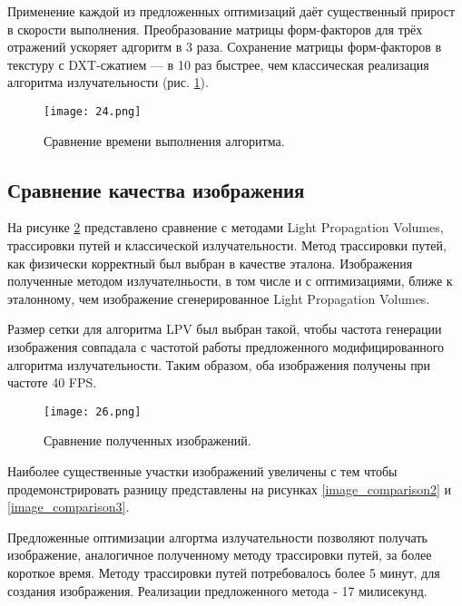 \documentclass[12pt,fleqn]{article}
\begin{document}
Применение каждой из предложенных оптимизаций даёт существенный прирост в скорости выполнения. Преобразование матрицы форм-факторов для трёх отражений ускоряет адгоритм в 3 раза. Сохранение матрицы форм-факторов в текстуру с DXT-сжатием --- в 10 раз быстрее, чем классическая реализация алгоритма излучательности (рис. \ref{speed_comparison}).

\begin{figure}[htb]
    \centering
    \texttt{[image: 24.png]}
    \caption{Сравнение времени выполнения алгоритма.}
    \label{speed_comparison}
\end{figure}


\subsection{Сравнение качества изображения}

На рисунке \ref{image_comparison} представлено сравнение с методами Light Propagation Volumes, трассировки путей и классической излучательности. Метод трассировки путей, как физически корректный был выбран в качестве эталона. Изображения полученные методом излучателньости, в том числе и с оптимизациями, ближе к эталонному, чем изображение сгенерированное Light Propagation Volumes. 

Размер сетки для алгоритма LPV был выбран такой, чтобы частота генерации изображения совпадала с частотой работы предложенного модифицированного алгоритма излучательности. Таким образом, оба изображения получены при частоте 40 FPS.

\pagebreak

\begin{figure}[htb]
    \centering
    \texttt{[image: 26.png]}
    \caption{Сравнение полученных изображений.}
    \label{image_comparison}
\end{figure}

Наиболее существенные участки изображений увеличены с тем чтобы продемонстрировать разницу представлены на рисунках \ref{image_comparison2} и \ref{image_comparison3}.

Предложенные оптимизации алгортма излучательности позволяют получать изображение, аналогичное полученному методу трассировки путей, за более короткое время. Методу трассировки путей потребовалось более 5 минут, для создания изображения. Реализации предложенного метода - 17 милисекунд.

\pagebreak
\end{document}
